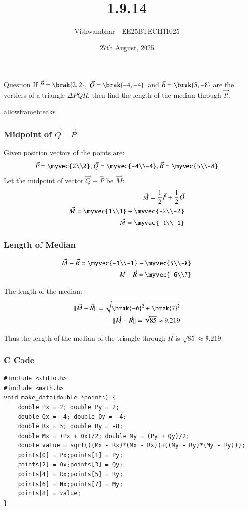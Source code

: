 \documentclass{beamer}
\title{1.9.14}
\date{27th August, 2025}
\author{Vishwambhar - EE25BTECH11025}
\begin{document}
\frame{\titlepage}
\begin{frame}{Question}
If $\vec{P}=\brak{2,2}$, $\vec{Q}=\brak{-4,-4}$, and $\vec{R}=\brak{5,-8}$ are the vertices of a triangle $\Delta PQR$, then find the length of the median through $\vec{R}$.\\
\end{frame}

\begin{frame}{allowframebreaks}
\frametitle{Midpoint of $\vec{Q}-\vec{P}$}
Given position vectors of the points are:
\begin{align}
    \vec{P}=\myvec{2\\2},
    \vec{Q}=\myvec{-4\\-4},
    \vec{R}=\myvec{5\\-8}
\end{align}
Let the midpoint of vector $\vec{Q}-\vec{P}$ be $\vec{M}$:
\begin{align}
    \vec{M}=\frac{1}{2}\vec{P}+\frac{1}{2}\vec{Q}\\
    \vec{M}=\myvec{1\\1}+\myvec{-2\\-2}\\
    \vec{M}=\myvec{-1\\-1}
\end{align}
\end{frame}

\begin{frame}[fragile]
\frametitle{Length of Median}
\begin{align}
    \vec{M}-\vec{R}=\myvec{-1\\-1}-\myvec{5\\-8}\\
    \vec{M}-\vec{R}=\myvec{-6\\7}
\end{align}

The length of the median:
\begin{align}
    ||\vec{M}-\vec{R}||=\sqrt{\brak{-6}^2+\brak{7}^2}\\
    ||\vec{M}-\vec{R}||=\sqrt{85}\approx9.219
\end{align}

Thus the length of the median of the triangle through $\vec{R}$ is $\sqrt{85}\approx9.219$.
\end{frame}

\begin{frame}[fragile]
    \frametitle{C Code}
    \begin{lstlisting}
#include <stdio.h>
#include <math.h>
void make_data(double *points) {
    double Px = 2; double Py = 2;
    double Qx = -4; double Qy = -4;
    double Rx = 5; double Ry = -8;
    double Mx = (Px + Qx)/2; double My = (Py + Qy)/2;
    double value = sqrt(((Mx - Rx)*(Mx - Rx))+((My - Ry)*(My - Ry)));
    points[0] = Px;points[1] = Py;
    points[2] = Qx;points[3] = Qy;
    points[4] = Rx;points[5] = Ry;
    points[6] = Mx;points[7] = My;
    points[8] = value;
}
    \end{lstlisting}
\end{frame}
\end{document}
